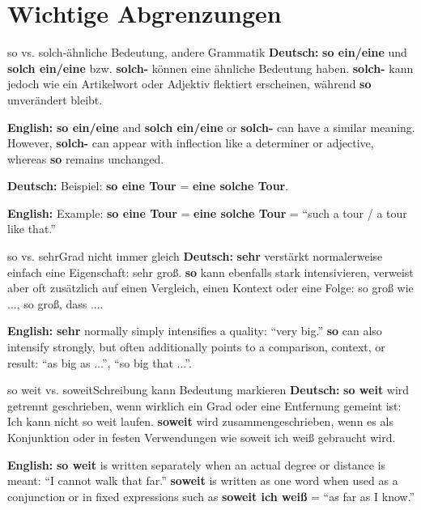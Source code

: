 \documentclass[a4paper,11pt]{article}
\newcommand{\GermanText}[1]{\textbf{Deutsch: }#1\par}
\newcommand{\EnglishText}[1]{{\small\color{SoftGray}\textbf{English: }#1\par}}
\begin{document}
    \section{Wichtige Abgrenzungen}

        \begin{grammarentry}{so vs. solch-}{ähnliche Bedeutung, andere Grammatik}
            \GermanText{\textbf{so ein/eine} und \textbf{solch ein/eine} bzw. \textbf{solch-} können eine ähnliche Bedeutung haben. \textbf{solch-} kann jedoch wie ein Artikelwort oder Adjektiv flektiert erscheinen, während \textbf{so} unverändert bleibt.}
            \EnglishText{\textbf{so ein/eine} and \textbf{solch ein/eine} or \textbf{solch-} can have a similar meaning. However, \textbf{solch-} can appear with inflection like a determiner or adjective, whereas \textbf{so} remains unchanged.}

            \GermanText{Beispiel: \textbf{so eine Tour} = \textbf{eine solche Tour}.}
            \EnglishText{Example: \textbf{so eine Tour} = \textbf{eine solche Tour} = ``such a tour / a tour like that.''}
        \end{grammarentry}

        \begin{grammarentry}{so vs. sehr}{Grad nicht immer gleich}
            \GermanText{\textbf{sehr} verstärkt normalerweise einfach eine Eigenschaft: \glqq sehr groß\grqq. \textbf{so} kann ebenfalls stark intensivieren, verweist aber oft zusätzlich auf einen Vergleich, einen Kontext oder eine Folge: \glqq so groß wie ...\grqq, \glqq so groß, dass ...\grqq.}
            \EnglishText{\textbf{sehr} normally simply intensifies a quality: ``very big.'' \textbf{so} can also intensify strongly, but often additionally points to a comparison, context, or result: ``as big as ...'', ``so big that ...''.}
        \end{grammarentry}

        \begin{grammarentry}{so weit vs. soweit}{Schreibung kann Bedeutung markieren}
            \GermanText{\textbf{so weit} wird getrennt geschrieben, wenn wirklich ein Grad oder eine Entfernung gemeint ist: \glqq Ich kann nicht so weit laufen.\grqq{} \textbf{soweit} wird zusammengeschrieben, wenn es als Konjunktion oder in festen Verwendungen wie \glqq soweit ich weiß\grqq{} gebraucht wird.}
            \EnglishText{\textbf{so weit} is written separately when an actual degree or distance is meant: ``I cannot walk that far.'' \textbf{soweit} is written as one word when used as a conjunction or in fixed expressions such as \textbf{soweit ich weiß} = ``as far as I know.''}
        \end{grammarentry}
\end{document}
